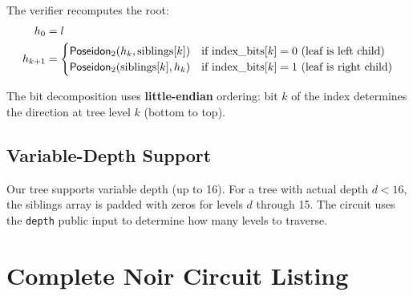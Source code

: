 The verifier recomputes the root:
\begin{align}
h_0 &= l \\
h_{k+1} &= \begin{cases}
\mathsf{Poseidon}_2(h_k, \text{siblings}[k]) & \text{if } \text{index\_bits}[k] = 0 \text{ (leaf is left child)} \\
\mathsf{Poseidon}_2(\text{siblings}[k], h_k) & \text{if } \text{index\_bits}[k] = 1 \text{ (leaf is right child)}
\end{cases}
\end{align}

The bit decomposition uses \textbf{little-endian} ordering: bit $k$ of the index determines the direction at tree level $k$ (bottom to top).

\subsection{Variable-Depth Support}

Our tree supports variable depth (up to 16). For a tree with actual depth $d < 16$, the siblings array is padded with zeros for levels $d$ through 15. The circuit uses the \texttt{depth} public input to determine how many levels to traverse.

\section{Complete Noir Circuit Listing}

